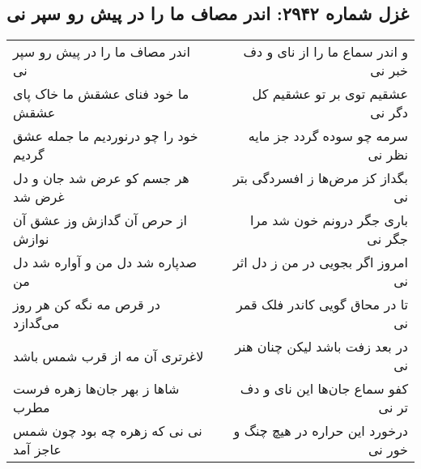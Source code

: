 \begin{center}
\section*{غزل شماره ۲۹۴۲: اندر مصاف ما را در پیش رو سپر نی}
\label{sec:2942}
\begin{longtable}{l p{0.5cm} r}
اندر مصاف ما را در پیش رو سپر نی
&&
و اندر سماع ما را از نای و دف خبر نی
\\
ما خود فنای عشقش ما خاک پای عشقش
&&
عشقیم توی بر تو عشقیم کل دگر نی
\\
خود را چو درنوردیم ما جمله عشق گردیم
&&
سرمه چو سوده گردد جز مایه نظر نی
\\
هر جسم کو عرض شد جان و دل غرض شد
&&
بگداز کز مرض‌ها ز افسردگی بتر نی
\\
از حرص آن گدازش وز عشق آن نوازش
&&
باری جگر درونم خون شد مرا جگر نی
\\
صدپاره شد دل من و آواره شد دل من
&&
امروز اگر بجویی در من ز دل اثر نی
\\
در قرص مه نگه کن هر روز می‌گدازد
&&
تا در محاق گویی کاندر فلک قمر نی
\\
لاغرتری آن مه از قرب شمس باشد
&&
در بعد زفت باشد لیکن چنان هنر نی
\\
شاها ز بهر جان‌ها زهره فرست مطرب
&&
کفو سماع جان‌ها این نای و دف تر نی
\\
نی نی که زهره چه بود چون شمس عاجز آمد
&&
درخورد این حراره در هیچ چنگ و خور نی
\\
\end{longtable}
\end{center}
